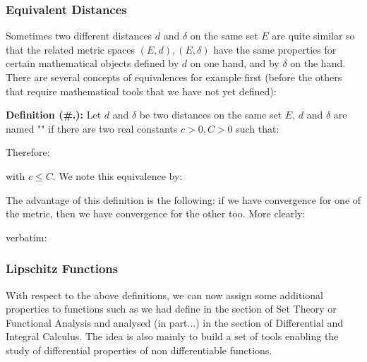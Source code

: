 	\pagebreak
	\subsubsection{Equivalent Distances}
	Sometimes two different distances $d$ and $\delta$ on the same set $E$ are quite similar so that the related metric spaces $(E,d),(E,\delta)$ have the same properties for certain mathematical objects defined by $d$ on one hand, and by $\delta$ on the hand. There are several concepts of equivalences for example first (before the others that require mathematical tools that we have not yet defined):

	\textbf{Definition (\#\thesection.\mydef):} Let $d$ and $\delta$ be two distances on the same set $E$, $d$ and $\delta$ are named "" if there are two real constants $c>0,C>0$ such that:
	
	Therefore:
	
	with $c\leq C$. We note this equivalence by:
	
	The advantage of this definition is the following: if we have convergence for one of the metric, then we have convergence for the other too. More clearly:
	
	verbatim:
	
	
	\subsubsection{Lipschitz Functions}\label{lipschitz functions}
	With respect to the above definitions, we can now assign some additional properties to functions such as we had define in the section of Set Theory or Functional Analysis and analysed (in part...) in the section of Differential and Integral Calculus. The idea is also mainly to build a set of tools enabling the study of differential properties of non differentiable functions.
	
